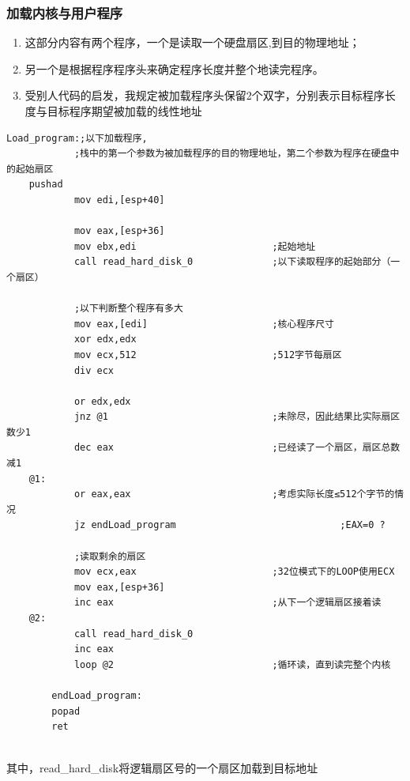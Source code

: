\documentclass[a4paper,11pt,UTF8]{ctexart}
\begin{document}
		\subsubsection{加载内核与用户程序}
			\begin{enumerate}
				\item 这部分内容有两个程序，一个是读取一个硬盘扇区,到目的物理地址；
				\item 另一个是根据程序程序头来确定程序长度并整个地读完程序。
				\item 受别人代码的启发，我规定被加载程序头保留2个双字，分别表示目标程序长度与目标程序期望被加载的线性地址
			\end{enumerate}

			\begin{lstlisting}[caption={Load\_progam},tabsize=4,basicstyle=\footnotesize,captionpos=b]
Load_program:;以下加载程序,
			;栈中的第一个参数为被加载程序的目的物理地址，第二个参数为程序在硬盘中的起始扇区
	pushad
			mov edi,[esp+40]

			mov eax,[esp+36]
			mov ebx,edi                        ;起始地址
			call read_hard_disk_0              ;以下读取程序的起始部分（一个扇区）

			;以下判断整个程序有多大
			mov eax,[edi]                      ;核心程序尺寸
			xor edx,edx
			mov ecx,512                        ;512字节每扇区
			div ecx

			or edx,edx
			jnz @1                             ;未除尽，因此结果比实际扇区数少1
			dec eax                            ;已经读了一个扇区，扇区总数减1
	@1:
			or eax,eax                         ;考虑实际长度≤512个字节的情况
			jz endLoad_program                             ;EAX=0 ?

			;读取剩余的扇区
			mov ecx,eax                        ;32位模式下的LOOP使用ECX
			mov eax,[esp+36]
			inc eax                            ;从下一个逻辑扇区接着读
	@2:
			call read_hard_disk_0
			inc eax
			loop @2                            ;循环读，直到读完整个内核

		endLoad_program:
		popad
		ret
				
			\end{lstlisting}
			其中，read\_hard\_disk将逻辑扇区号的一个扇区加载到目标地址
\end{document}
